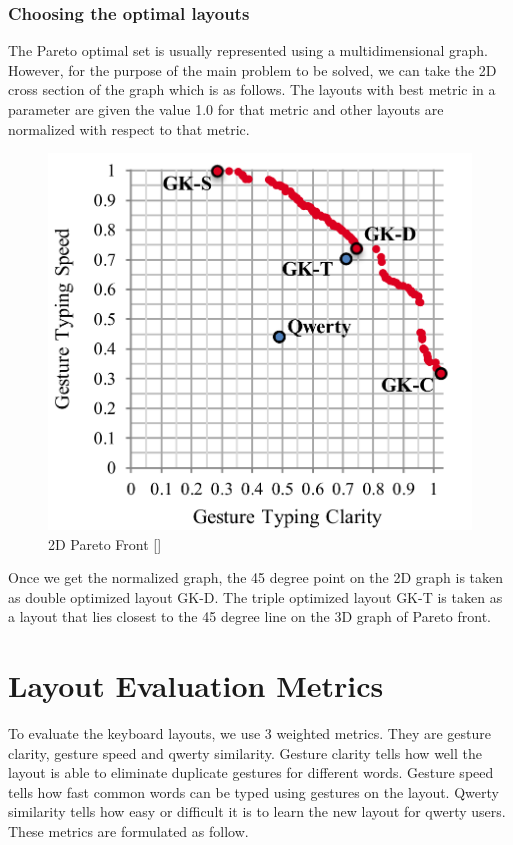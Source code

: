 \documentclass[MTech]{iitmdiss}
\begin{document}
\newpage
\subsection{Choosing the optimal layouts}
The Pareto optimal set is usually represented using a multidimensional graph. However, for the purpose of the main problem to be solved, we can take the 2D cross section of the graph which is as follows. The layouts with best metric in a parameter are given the value 1.0 for that metric and other layouts are normalized with respect to that metric.


\begin{figure}[h!]
	\centering
	\includegraphics[scale=0.5]{Images/svc}
	\caption{2D Pareto Front [\cite{gesturerecog}]}
\end{figure}

Once we get the normalized graph, the 45 degree point on the 2D graph is taken as double optimized layout GK-D.
The triple optimized layout GK-T is taken as a layout that lies closest to the 45 degree line on the 3D graph of Pareto front.

\chapter{Layout Evaluation Metrics}
To evaluate the keyboard layouts, we use 3 weighted metrics. They are gesture clarity, gesture speed and qwerty similarity. Gesture clarity tells how well the layout is able to eliminate duplicate gestures for different words. Gesture speed tells how fast common words can be typed using gestures on the layout. Qwerty similarity tells how easy or difficult it is to learn the new layout for qwerty users.\\
These metrics are formulated as follow.
\end{document}
